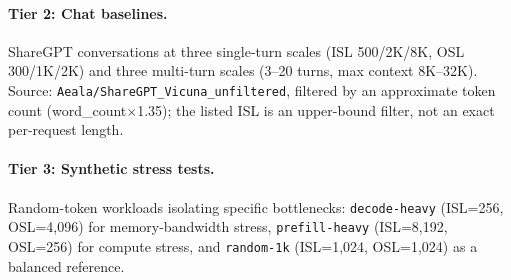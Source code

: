 \paragraph{Tier 2: Chat baselines.} ShareGPT conversations at three single-turn scales (ISL 500/2K/8K, OSL 300/1K/2K) and three multi-turn scales (3--20 turns, max context 8K--32K). Source: \texttt{Aeala/ShareGPT\_Vicuna\_unfiltered}, filtered by an approximate token count (word\_count$\times$1.35); the listed ISL is an upper-bound filter, not an exact per-request length.

\paragraph{Tier 3: Synthetic stress tests.} Random-token workloads isolating specific bottlenecks: \texttt{decode-heavy} (ISL=256, OSL=4{,}096) for memory-bandwidth stress, \texttt{prefill-heavy} (ISL=8{,}192, OSL=256) for compute stress, and \texttt{random-1k} (ISL=1{,}024, OSL=1{,}024) as a balanced reference.

